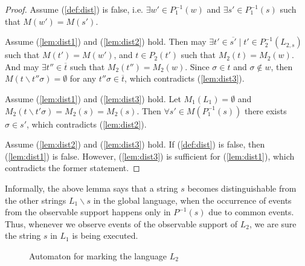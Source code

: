 \documentclass[letterpaper, 10pt, conference]{ieeeconf}
\begin{document}
\begin{proof}
Assume (\ref{def:dist}) is false, i.e. $\exists w' \in P_1^{-1}(w)$ and $\exists
s' \in P_1^{-1}(s)$ such that $M(w') = M(s')$. 

Assume (\ref{lem:dist1}) and (\ref{lem:dist2}) hold. Then may $\exists t' \in
\overline{s'} \mid t' \in P_2^{-1}(L_{2,s})$ such that $M(t') = M(w')$, and $t
\in P_2(t')$ such that $M_2(t) = M_2(w)$. And may $\exists t'' \in \overline{t}$
such that $M_2(t'') = M_2(w)$. Since $\sigma \in t$ and $\sigma \not \in w$,
then $M(t \backslash t''\sigma) = \emptyset$ for any $t''\sigma \in
\overline{t}$, which contradicts (\ref{lem:dist3}).

Assume (\ref{lem:dist1}) and (\ref{lem:dist3}) hold. Let $M_1(L_1) = \emptyset$
and $M_2(t\backslash t'\sigma) = M_2(s) = M_2(s)$. Then $\forall s' \in
M(P_1^{-1}(s))$ there exists $\sigma \in s'$, which contradicts
(\ref{lem:dist2}).

Assume (\ref{lem:dist2}) and (\ref{lem:dist3}) hold. If (\ref{def:dist}) is
false, then (\ref{lem:dist1}) is false. However, (\ref{lem:dist3}) is sufficient
for (\ref{lem:dist1}), which contradicts the former statement.
\end{proof}

Informally, the above lemma says that a string $s$ becomes distinguishable from
the other strings $L_1\backslash s$ in the global language, when the occurrence
of events from the observable support happens only in $P^{-1}(s)$ due to
common events. Thus, whenever we observe events of the observable support of
$L_2$, we are sure the string $s$ in $L_1$ is being executed.


\begin{figure}[t]
\centering
{}
\caption{Automaton for marking the language $L_2$}
\label{fig:marking_L2}
\end{figure}
\end{document}
